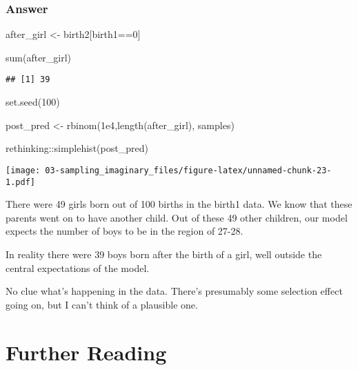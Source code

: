 \documentclass[
]{book}
\newenvironment{Shaded}{\begin{snugshade}}{\end{snugshade}}
\newcommand{\DecValTok}[1]{\textcolor[rgb]{0.00,0.00,0.81}{#1}}
\newcommand{\FloatTok}[1]{\textcolor[rgb]{0.00,0.00,0.81}{#1}}
\newcommand{\FunctionTok}[1]{\textcolor[rgb]{0.00,0.00,0.00}{#1}}
\newcommand{\NormalTok}[1]{#1}
\newcommand{\OtherTok}[1]{\textcolor[rgb]{0.56,0.35,0.01}{#1}}
\newcommand{\SpecialCharTok}[1]{\textcolor[rgb]{0.00,0.00,0.00}{#1}}
\begin{document}
\hypertarget{answer-32}{%
\subsubsection*{Answer}\label{answer-32}}

\begin{Shaded}
\begin{Highlighting}[]
\NormalTok{after\_girl }\OtherTok{\textless{}{-}}\NormalTok{ birth2[birth1}\SpecialCharTok{==}\DecValTok{0}\NormalTok{]}

\FunctionTok{sum}\NormalTok{(after\_girl)}
\end{Highlighting}
\end{Shaded}

\begin{verbatim}
## [1] 39
\end{verbatim}

\begin{Shaded}
\begin{Highlighting}[]
\FunctionTok{set.seed}\NormalTok{(}\DecValTok{100}\NormalTok{)}

\NormalTok{post\_pred }\OtherTok{\textless{}{-}} \FunctionTok{rbinom}\NormalTok{(}\FloatTok{1e4}\NormalTok{,}\FunctionTok{length}\NormalTok{(after\_girl), samples)}

\NormalTok{rethinking}\SpecialCharTok{::}\FunctionTok{simplehist}\NormalTok{(post\_pred)}
\end{Highlighting}
\end{Shaded}

\texttt{[image: 03-sampling\_imaginary\_files/figure-latex/unnamed-chunk-23-1.pdf]}

There were 49 girls born out of 100 births in the birth1 data. We know that these parents went on to have another child. Out of these 49 other children, our model expects the number of boys to be in the region of 27-28.

In reality there were 39 boys born after the birth of a girl, well outside the central expectations of the model.

No clue what's happening in the data. There's presumably some selection effect going on, but I can't think of a plausible one.

\hypertarget{further-reading-2}{%
\section*{Further Reading}\label{further-reading-2}}
\end{document}
